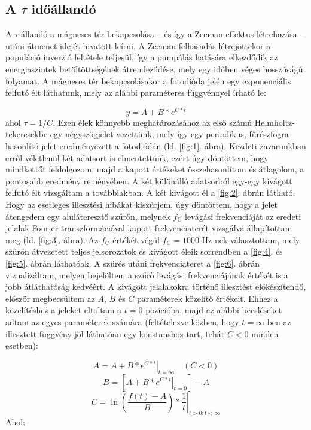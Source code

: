 \begin{multicols}{2}
\subsection{A $\tau$ időállandó}
A $\tau$ állandó a mágneses tér bekapcsolása -- és így a Zeeman-effektus létrehozása -- utáni átmenet idejét hivatott leírni. A Zeeman-felhasadás létrejöttekor a populáció inverzió feltétele teljesül, így a pumpálás hatására elkezdődik az energiaszintek betöltöttségének átrendeződése, mely egy időben véges hosszúságú folyamat. A mágneses tér bekapcsolásakor a fotodióda jelén egy exponenciális felfutó élt láthatunk, mely az alábbi paraméteres függvénnyel írható le:

\begin{equation} \label{eq:2}
y
=
A + B * e^{C * t}
\end{equation}
ahol $\tau = 1/C$. Ezen élek könnyebb meghatározásához az első számú Helmholtz-tekercsekbe egy négyszögjelet vezettünk, mely így egy periodikus, fűrészfogra hasonlító jelet eredményezett a fotodiódán (ld. \ref{fig:1}. ábra). Kezdeti zavarunkban erről véletlenül két adatsort is elmentettünk, ezért úgy döntöttem, hogy mindkettőt feldolgozom, majd a kapott értékeket összehasonlítom és átlagolom, a pontosabb eredmény reményében. \newline
A két különálló adatsorból egy-egy kivágott felfutó élt vizsgáltam a továbbiakban. A két kivágott él a \ref{fig:2}. ábrán látható. Hogy az esetleges illesztési hibákat kiszűrjem, úgy döntöttem, hogy a jelet átengedem egy aluláteresztő szűrőn, melynek $f_{\text{C}}$ levágási frekvenciáját az eredeti jelalak Fourier-transzformációval kapott frekvenciaterét vizsgálva állapítottam meg (ld. \ref{fig:3}. ábra). Az $f_{\text{C}}$ értékét végül $f_{\text{C}} = 1000$ Hz-nek választottam, mely szűrőn átvezetett teljes jelsorozatok és kivágott éleik sorrendben a \ref{fig:4}. és \ref{fig:5}. ábrán láthatóak. A szűrés utáni frekvenciateret a \ref{fig:6}. ábrán vizualizáltam, melyen bejelöltem a szűrő levágási frekvenciájának értékét is a jobb átláthatóság kedvéért. \newline
A kivágott jelalakokra történő illesztést előkészítendő, először megbecsültem az $A$, $B$ és $C$ paraméterek közelítő értékeit. Ehhez a közelítéshez a jeleket eltoltam a $t = 0$ pozícióba, majd az alábbi becsléseket adtam az egyes paraméterek számára (feltételezve közben, hogy $t = \infty$-ben az illesztett függvény jól láthatóan egy konstanshoz tart, tehát $C < 0$ minden esetben):

\begin{equation*}
A
=
\left. A + B * e^{C * t} \right|_{t = \infty} \quad (C < 0)
\end{equation*}
\begin{equation*}
B
=
\left[ \left. A + B * e^{C * t} \right|_{t = 0} \right] - A
\end{equation*}
\begin{equation*}
C
=
\left. \ln \left( \frac{f \left( t \right) - A}{B} \right) * \frac{1}{t} \right|_{t > 0; t < \infty}
\end{equation*}
Ahol:


\end{multicols}
